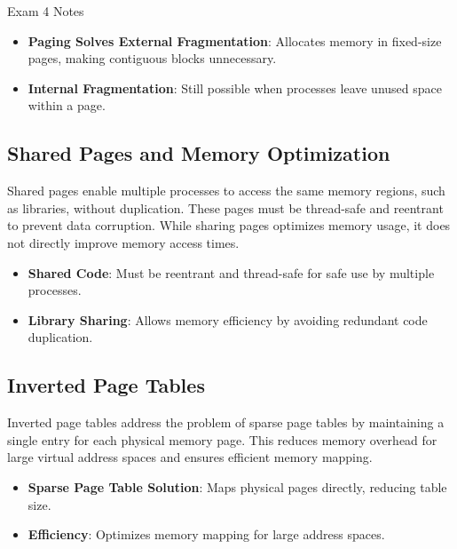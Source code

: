 \begin{examnotes}{Exam 4 Notes}
    \begin{highlight}
        \begin{itemize}
            \item \textbf{Paging Solves External Fragmentation}: Allocates memory in fixed-size pages, making contiguous blocks unnecessary.
            \item \textbf{Internal Fragmentation}: Still possible when processes leave unused space within a page.
        \end{itemize}
    \end{highlight}
    
    \subsection*{Shared Pages and Memory Optimization}
    
    Shared pages enable multiple processes to access the same memory regions, such as libraries, without duplication. These pages must be thread-safe and reentrant to prevent data corruption. While 
    sharing pages optimizes memory usage, it does not directly improve memory access times.
    
    \begin{highlight}
        \begin{itemize}
            \item \textbf{Shared Code}: Must be reentrant and thread-safe for safe use by multiple processes.
            \item \textbf{Library Sharing}: Allows memory efficiency by avoiding redundant code duplication.
        \end{itemize}
    \end{highlight}
    
    \subsection*{Inverted Page Tables}
    
    Inverted page tables address the problem of sparse page tables by maintaining a single entry for each physical memory page. This reduces memory overhead for large virtual address spaces and ensures 
    efficient memory mapping.
    
    \begin{highlight}
        \begin{itemize}
            \item \textbf{Sparse Page Table Solution}: Maps physical pages directly, reducing table size.
            \item \textbf{Efficiency}: Optimizes memory mapping for large address spaces.
        \end{itemize}
    \end{highlight}
    

\end{examnotes}
